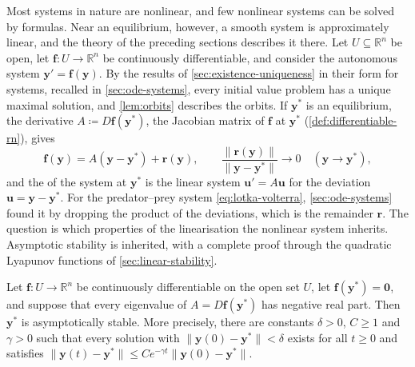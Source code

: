 Most systems in nature are nonlinear, and few nonlinear systems can be solved by formulas. Near an equilibrium, however, a smooth system is approximately linear, and the theory of the preceding sections describes it there. Let $U\subseteq\mathbb R^n$ be open, let $\mathbf f\colon U\to\mathbb R^n$ be continuously differentiable, and consider the autonomous system $\mathbf y'=\mathbf f(\mathbf y)$. By the results of \cref{sec:existence-uniqueness} in their form for systems, recalled in \cref{sec:ode-systems}, every initial value problem has a unique maximal solution, and \cref{lem:orbits} describes the orbits. If $\mathbf y^*$ is an equilibrium, the derivative $A\coloneqq D\mathbf f(\mathbf y^*)$, the Jacobian matrix of $\mathbf f$ at $\mathbf y^*$ (\cref{def:differentiable-rn}), gives
\[
\mathbf f(\mathbf y)=A(\mathbf y-\mathbf y^*)+\mathbf r(\mathbf y),\qquad\frac{\|\mathbf r(\mathbf y)\|}{\|\mathbf y-\mathbf y^*\|}\to0\quad(\mathbf y\to\mathbf y^*),
\]
and the  of the system at $\mathbf y^*$ is the linear system $\mathbf u'=A\mathbf u$ for the deviation $\mathbf u=\mathbf y-\mathbf y^*$. For the predator--prey system \eqref{eq:lotka-volterra}, \cref{sec:ode-systems} found it by dropping the product of the deviations, which is the remainder $\mathbf r$. The question is which properties of the linearisation the nonlinear system inherits. Asymptotic stability is inherited, with a complete proof through the quadratic Lyapunov functions of \cref{sec:linear-stability}.

\begin{theorem}
\label{thm:linearised-stability-systems}
Let $\mathbf f\colon U\to\mathbb R^n$ be continuously differentiable on the open set $U$, let $\mathbf f(\mathbf y^*)=\mathbf 0$, and suppose that every eigenvalue of $A=D\mathbf f(\mathbf y^*)$ has negative real part. Then $\mathbf y^*$ is asymptotically stable. More precisely, there are constants $\delta>0$, $C\ge1$ and $\gamma>0$ such that every solution with $\|\mathbf y(0)-\mathbf y^*\|<\delta$ exists for all $t\ge0$ and satisfies $\|\mathbf y(t)-\mathbf y^*\|\le Ce^{-\gamma t}\|\mathbf y(0)-\mathbf y^*\|$.
\end{theorem}

